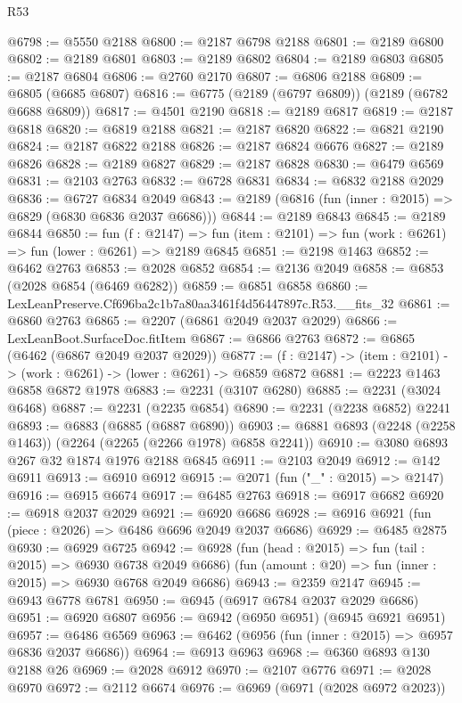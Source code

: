 \begin{lexlean}{R53}
\begin{coremodule}
@6798 := @5550 @2188
@6800 := @2187 @6798 @2188
@6801 := @2189 @6800
@6802 := @2189 @6801
@6803 := @2189 @6802
@6804 := @2189 @6803
@6805 := @2187 @6804
@6806 := @2760 @2170
@6807 := @6806 @2188
@6809 := @6805 (@6685 @6807)
@6816 := @6775 (@2189 (@6797 @6809)) (@2189 (@6782 @6688 @6809))
@6817 := @4501 @2190
@6818 := @2189 @6817
@6819 := @2187 @6818
@6820 := @6819 @2188
@6821 := @2187 @6820
@6822 := @6821 @2190
@6824 := @2187 @6822 @2188
@6826 := @2187 @6824 @6676
@6827 := @2189 @6826
@6828 := @2189 @6827
@6829 := @2187 @6828
@6830 := @6479 @6569
@6831 := @2103 @2763
@6832 := @6728 @6831
@6834 := @6832 @2188 @2029
@6836 := @6727 @6834 @2049
@6843 := @2189 (@6816 (fun (inner : @2015) => @6829 (@6830 @6836 @2037 @6686)))
@6844 := @2189 @6843
@6845 := @2189 @6844
@6850 := fun (f : @2147) =>
  fun (item : @2101) => fun (work : @6261) => fun (lower : @6261) => @2189 @6845
@6851 := @2198 @1463
@6852 := @6462 @2763
@6853 := @2028 @6852
@6854 := @2136 @2049
@6858 := @6853 (@2028 @6854 (@6469 @6282))
@6859 := @6851 @6858
@6860 := LexLeanPreserve.Cf696ba2c1b7a80aa3461f4d56447897c.R53.__fits_32
@6861 := @6860 @2763
@6865 := @2207 (@6861 @2049 @2037 @2029)
@6866 := LexLeanBoot.SurfaceDoc.fitItem
@6867 := @6866 @2763
@6872 := @6865 (@6462 (@6867 @2049 @2037 @2029))
@6877 := (f : @2147) -> (item : @2101) -> (work : @6261) -> (lower : @6261) -> @6859 @6872
@6881 := @2223 @1463 @6858 @6872 @1978
@6883 := @2231 (@3107 @6280)
@6885 := @2231 (@3024 @6468)
@6887 := @2231 (@2235 @6854)
@6890 := @2231 (@2238 @6852) @2241
@6893 := @6883 (@6885 (@6887 @6890))
@6903 := @6881 @6893 (@2248 (@2258 @1463)) (@2264 (@2265 (@2266 @1978) @6858 @2241))
@6910 := @3080 @6893 @267 @32 @1874 @1976 @2188 @6845
@6911 := @2103 @2049
@6912 := @142 @6911
@6913 := @6910 @6912
@6915 := @2071 (fun ("_" : @2015) => @2147)
@6916 := @6915 @6674
@6917 := @6485 @2763
@6918 := @6917 @6682
@6920 := @6918 @2037 @2029
@6921 := @6920 @6686
@6928 := @6916 @6921 (fun (piece : @2026) => @6486 @6696 @2049 @2037 @6686)
@6929 := @6485 @2875
@6930 := @6929 @6725
@6942 := @6928
    (fun (head : @2015) => fun (tail : @2015) => @6930 @6738 @2049 @6686)
    (fun (amount : @20) => fun (inner : @2015) => @6930 @6768 @2049 @6686)
@6943 := @2359 @2147
@6945 := @6943 @6778 @6781
@6950 := @6945 (@6917 @6784 @2037 @2029 @6686)
@6951 := @6920 @6807
@6956 := @6942 (@6950 @6951) (@6945 @6921 @6951)
@6957 := @6486 @6569
@6963 := @6462 (@6956 (fun (inner : @2015) => @6957 @6836 @2037 @6686))
@6964 := @6913 @6963
@6968 := @6360 @6893 @130 @2188 @26
@6969 := @2028 @6912
@6970 := @2107 @6776
@6971 := @2028 @6970
@6972 := @2112 @6674
@6976 := @6969 (@6971 (@2028 @6972 @2023))

\end{coremodule}
\end{lexlean}
